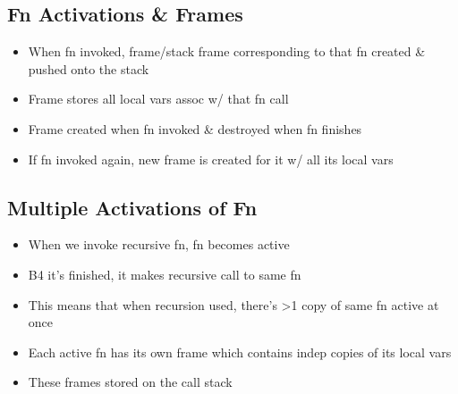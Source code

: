 \documentclass{article}
\begin{document}
\subsection{Fn Activations \& Frames}
    \begin{multicols}{2}
        \begin{itemize}
            \item When fn invoked, frame/stack frame corresponding to that fn created \& pushed onto the stack
            \item Frame stores all local vars assoc w/ that fn call
            \item Frame created when fn invoked \& destroyed when fn finishes
            \item If fn invoked again, new frame is created for it w/ all its local vars
        \end{itemize}
    \end{multicols}

\subsection{Multiple Activations of Fn}
    \begin{multicols}{2}
        \begin{itemize}
            \item When we invoke recursive fn, fn becomes active
            \item B4 it's finished, it makes recursive call to same fn
            \item This means that when recursion used, there's >1 copy of same fn active at once
            \item Each active fn has its own frame which contains indep copies of its local vars
            \item These frames stored on the call stack
        \end{itemize}
    \end{multicols}
\end{document}

